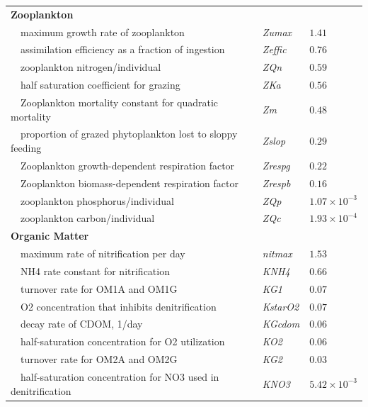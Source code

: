 \documentclass[letterpaper,12pt,oneside]{article}\usepackage[]{graphicx}\usepackage[]{color}
\begin{document}
\begin{table}[!tbp]
{\begin{center}
\begin{tabular}{lll}
\hline
{\bfseries Zooplankton}&&\tabularnewline
~~maximum growth rate of zooplankton&\textit{Zumax}&$1.41$\tabularnewline
~~assimilation efficiency as a fraction of ingestion&\textit{Zeffic}&$0.76$\tabularnewline
~~zooplankton nitrogen/individual&\textit{ZQn}&$0.59$\tabularnewline
~~half saturation coefficient for grazing&\textit{ZKa}&$0.56$\tabularnewline
~~Zooplankton mortality constant for quadratic mortality&\textit{Zm}&$0.48$\tabularnewline
~~proportion of grazed phytoplankton lost to sloppy feeding&\textit{Zslop}&$0.29$\tabularnewline
~~Zooplankton growth-dependent respiration factor&\textit{Zrespg}&$0.22$\tabularnewline
~~Zooplankton biomass-dependent respiration factor&\textit{Zrespb}&$0.16$\tabularnewline
~~zooplankton phosphorus/individual&\textit{ZQp}&$1.07\times 10^{-3}$\tabularnewline
~~zooplankton carbon/individual&\textit{ZQc}&$1.93\times 10^{-4}$\tabularnewline
\hline
{\bfseries Organic Matter}&&\tabularnewline
~~maximum rate of nitrification per day&\textit{nitmax}&$1.53$\tabularnewline
~~NH4 rate constant for nitrification&\textit{KNH4}&$0.66$\tabularnewline
~~turnover rate for OM1A and OM1G&\textit{KG1}&$0.07$\tabularnewline
~~O2 concentration that inhibits denitrification&\textit{KstarO2}&$0.07$\tabularnewline
~~decay rate of CDOM, 1/day&\textit{KGcdom}&$0.06$\tabularnewline
~~half-saturation concentration for O2 utilization&\textit{KO2}&$0.06$\tabularnewline
~~turnover rate for OM2A and OM2G&\textit{KG2}&$0.03$\tabularnewline
~~half-saturation concentration for NO3 used in denitrification&\textit{KNO3}&$5.42\times 10^{-3}$\tabularnewline
\hline
\end{tabular}\end{center}}

\end{table}
\end{document}
